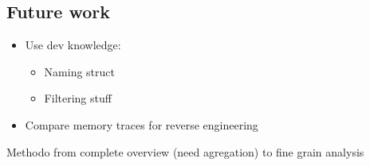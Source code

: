 \subsection{Future work}

\begin{itemize}
    \item Use dev knowledge:
        \begin{itemize}
            \item Naming struct
            \item Filtering stuff
        \end{itemize}
    \item Compare memory traces for reverse engineering
\end{itemize}

Methodo from complete overview (need agregation) to fine grain analysis

